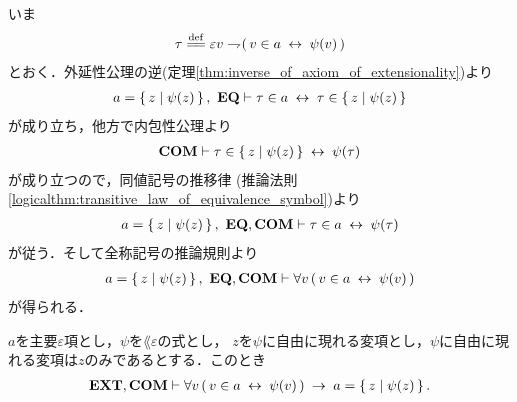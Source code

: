 	\begin{sketch}
		いま
		\begin{align}
			\tau \defeq \varepsilon v \negation (\, v \in a \lrarrow \psi(v)\, )
		\end{align}
		とおく．外延性公理の逆(定理\ref{thm:inverse_of_axiom_of_extensionality})より
		\begin{align}
			a = \left\{\, z \mid \psi(z)\, \right\},\ \mbox{{\bf EQ}} \vdash 
			\tau \in a \hspace{0.25em}\leftrightarrow\hspace{0.25em} \tau \in \left\{\, z \mid \psi(z)\, \right\}
		\end{align}
		が成り立ち，他方で内包性公理より
		\begin{align}
			\mbox{\bf COM} \vdash \tau \in \left\{\, z \mid \psi(z)\, \right\} \hspace{0.25em}\leftrightarrow\hspace{0.25em} \psi(\tau)
		\end{align}
		が成り立つので，同値記号の推移律
		(推論法則\ref{logicalthm:transitive_law_of_equivalence_symbol})より
		\begin{align}
			a = \left\{\, z \mid \psi(z)\, \right\},\ \mbox{{\bf EQ}},\mbox{\bf COM} \vdash \tau \in a \hspace{0.25em}\leftrightarrow\hspace{0.25em} \psi(\tau)
		\end{align}
		が従う．そして全称記号の推論規則より
		\begin{align}
			a = \left\{\, z \mid \psi(z)\, \right\},\ \mbox{{\bf EQ}},\mbox{\bf COM} \vdash 
			\forall v\, (\, v \in a \hspace{0.25em}\leftrightarrow\hspace{0.25em} \psi(v)\, )
		\end{align}
		が得られる．
		\QED
	\end{sketch}
	
	\begin{screen}
		\begin{thm}
		\label{thm:equivalent_formula_rewriting_2}
			$a$を主要$\varepsilon$項とし，$\psi$を$\lang{\varepsilon}$の式とし，
			$z$を$\psi$に自由に現れる変項とし，$\psi$に自由に現れる変項は$z$のみであるとする．このとき
			\begin{align}
				\mbox{{\bf EXT}},\mbox{\bf COM} \vdash \forall v\, (\, v \in a \hspace{0.25em}\leftrightarrow\hspace{0.25em} \psi(v)\, )
				\hspace{0.25em}\rightarrow\hspace{0.25em} a = \left\{\, z \mid \psi(z)\, \right\}.
			\end{align}
		\end{thm}
	\end{screen}
	
